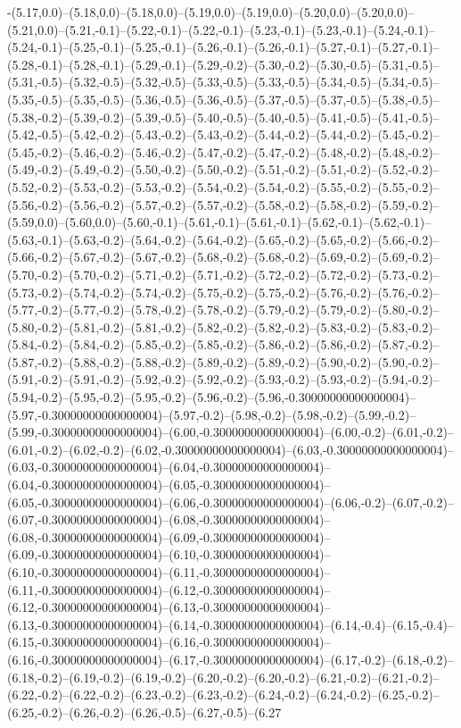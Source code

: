 -(5.17,0.0)--(5.18,0.0)--(5.18,0.0)--(5.19,0.0)--(5.19,0.0)--(5.20,0.0)--(5.20,0.0)--(5.21,0.0)--(5.21,-0.1)--(5.22,-0.1)--(5.22,-0.1)--(5.23,-0.1)--(5.23,-0.1)--(5.24,-0.1)--(5.24,-0.1)--(5.25,-0.1)--(5.25,-0.1)--(5.26,-0.1)--(5.26,-0.1)--(5.27,-0.1)--(5.27,-0.1)--(5.28,-0.1)--(5.28,-0.1)--(5.29,-0.1)--(5.29,-0.2)--(5.30,-0.2)--(5.30,-0.5)--(5.31,-0.5)--(5.31,-0.5)--(5.32,-0.5)--(5.32,-0.5)--(5.33,-0.5)--(5.33,-0.5)--(5.34,-0.5)--(5.34,-0.5)--(5.35,-0.5)--(5.35,-0.5)--(5.36,-0.5)--(5.36,-0.5)--(5.37,-0.5)--(5.37,-0.5)--(5.38,-0.5)--(5.38,-0.2)--(5.39,-0.2)--(5.39,-0.5)--(5.40,-0.5)--(5.40,-0.5)--(5.41,-0.5)--(5.41,-0.5)--(5.42,-0.5)--(5.42,-0.2)--(5.43,-0.2)--(5.43,-0.2)--(5.44,-0.2)--(5.44,-0.2)--(5.45,-0.2)--(5.45,-0.2)--(5.46,-0.2)--(5.46,-0.2)--(5.47,-0.2)--(5.47,-0.2)--(5.48,-0.2)--(5.48,-0.2)--(5.49,-0.2)--(5.49,-0.2)--(5.50,-0.2)--(5.50,-0.2)--(5.51,-0.2)--(5.51,-0.2)--(5.52,-0.2)--(5.52,-0.2)--(5.53,-0.2)--(5.53,-0.2)--(5.54,-0.2)--(5.54,-0.2)--(5.55,-0.2)--(5.55,-0.2)--(5.56,-0.2)--(5.56,-0.2)--(5.57,-0.2)--(5.57,-0.2)--(5.58,-0.2)--(5.58,-0.2)--(5.59,-0.2)--(5.59,0.0)--(5.60,0.0)--(5.60,-0.1)--(5.61,-0.1)--(5.61,-0.1)--(5.62,-0.1)--(5.62,-0.1)--(5.63,-0.1)--(5.63,-0.2)--(5.64,-0.2)--(5.64,-0.2)--(5.65,-0.2)--(5.65,-0.2)--(5.66,-0.2)--(5.66,-0.2)--(5.67,-0.2)--(5.67,-0.2)--(5.68,-0.2)--(5.68,-0.2)--(5.69,-0.2)--(5.69,-0.2)--(5.70,-0.2)--(5.70,-0.2)--(5.71,-0.2)--(5.71,-0.2)--(5.72,-0.2)--(5.72,-0.2)--(5.73,-0.2)--(5.73,-0.2)--(5.74,-0.2)--(5.74,-0.2)--(5.75,-0.2)--(5.75,-0.2)--(5.76,-0.2)--(5.76,-0.2)--(5.77,-0.2)--(5.77,-0.2)--(5.78,-0.2)--(5.78,-0.2)--(5.79,-0.2)--(5.79,-0.2)--(5.80,-0.2)--(5.80,-0.2)--(5.81,-0.2)--(5.81,-0.2)--(5.82,-0.2)--(5.82,-0.2)--(5.83,-0.2)--(5.83,-0.2)--(5.84,-0.2)--(5.84,-0.2)--(5.85,-0.2)--(5.85,-0.2)--(5.86,-0.2)--(5.86,-0.2)--(5.87,-0.2)--(5.87,-0.2)--(5.88,-0.2)--(5.88,-0.2)--(5.89,-0.2)--(5.89,-0.2)--(5.90,-0.2)--(5.90,-0.2)--(5.91,-0.2)--(5.91,-0.2)--(5.92,-0.2)--(5.92,-0.2)--(5.93,-0.2)--(5.93,-0.2)--(5.94,-0.2)--(5.94,-0.2)--(5.95,-0.2)--(5.95,-0.2)--(5.96,-0.2)--(5.96,-0.30000000000000004)--(5.97,-0.30000000000000004)--(5.97,-0.2)--(5.98,-0.2)--(5.98,-0.2)--(5.99,-0.2)--(5.99,-0.30000000000000004)--(6.00,-0.30000000000000004)--(6.00,-0.2)--(6.01,-0.2)--(6.01,-0.2)--(6.02,-0.2)--(6.02,-0.30000000000000004)--(6.03,-0.30000000000000004)--(6.03,-0.30000000000000004)--(6.04,-0.30000000000000004)--(6.04,-0.30000000000000004)--(6.05,-0.30000000000000004)--(6.05,-0.30000000000000004)--(6.06,-0.30000000000000004)--(6.06,-0.2)--(6.07,-0.2)--(6.07,-0.30000000000000004)--(6.08,-0.30000000000000004)--(6.08,-0.30000000000000004)--(6.09,-0.30000000000000004)--(6.09,-0.30000000000000004)--(6.10,-0.30000000000000004)--(6.10,-0.30000000000000004)--(6.11,-0.30000000000000004)--(6.11,-0.30000000000000004)--(6.12,-0.30000000000000004)--(6.12,-0.30000000000000004)--(6.13,-0.30000000000000004)--(6.13,-0.30000000000000004)--(6.14,-0.30000000000000004)--(6.14,-0.4)--(6.15,-0.4)--(6.15,-0.30000000000000004)--(6.16,-0.30000000000000004)--(6.16,-0.30000000000000004)--(6.17,-0.30000000000000004)--(6.17,-0.2)--(6.18,-0.2)--(6.18,-0.2)--(6.19,-0.2)--(6.19,-0.2)--(6.20,-0.2)--(6.20,-0.2)--(6.21,-0.2)--(6.21,-0.2)--(6.22,-0.2)--(6.22,-0.2)--(6.23,-0.2)--(6.23,-0.2)--(6.24,-0.2)--(6.24,-0.2)--(6.25,-0.2)--(6.25,-0.2)--(6.26,-0.2)--(6.26,-0.5)--(6.27,-0.5)--(6.27